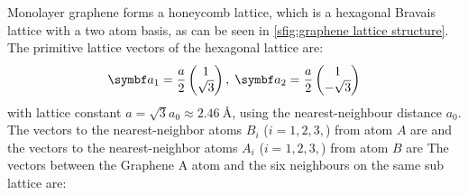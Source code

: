 \documentclass[../notes.tex]{subfiles}
\begin{document}
Monolayer graphene forms a honeycomb lattice, which is a hexagonal Bravais lattice with a two atom basis, as can be seen in \cref{sfig:graphene lattice structure}.
The primitive lattice vectors of the hexagonal lattice are:
\begin{align}
	\vb{a}_1 = \frac{a}{2} \begin{pmatrix} 1 \\ \sqrt{3} \end{pmatrix}, \; \vb{a}_2 = \frac{a}{2} \begin{pmatrix} 1 \\ -\sqrt{3} \end{pmatrix}
\end{align}
with lattice constant \(a = \sqrt{3} a_0 \approx \SI{2.46}{\angstrom}\), using the nearest-neighbour distance \(a_0\).
The vectors to the nearest-neighbor atoms \(B_i\) (\(i = 1, 2, 3,\)) from atom \(A\) are
and the vectors to the nearest-neighbor atoms \(A_i\) (\(i = 1, 2, 3,\)) from atom \(B\) are
The vectors between the Graphene \(\mathrm{A}\) atom and the six neighbours on the same sub lattice are:
\end{document}
